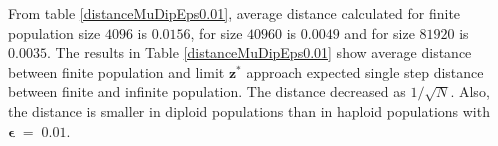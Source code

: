 From table \ref{distanceMuDipEps0.01}, average distance calculated for finite population size $4096$ is $0.0156$, 
for size $40960$ is $0.0049$ and for size $81920$ is $0.0035$. The results in Table \ref{distanceMuDipEps0.01} show average distance 
between finite population and limit $\bm{z^\ast}$ approach expected single step distance 
between finite and infinite population. The distance decreased as $1/\sqrt{N}$. 
Also, the distance is smaller in diploid populations than in haploid populations with $\bm{\epsilon} \;=\; 0.01$.



